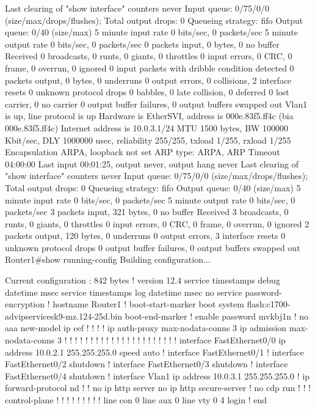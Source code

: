   Last clearing of "show interface" counters never
  Input queue: 0/75/0/0 (size/max/drops/flushes); Total output drops: 0
  Queueing strategy: fifo
  Output queue: 0/40 (size/max)
  5 minute input rate 0 bits/sec, 0 packets/sec
  5 minute output rate 0 bits/sec, 0 packets/sec
     0 packets input, 0 bytes, 0 no buffer
     Received 0 broadcasts, 0 runts, 0 giants, 0 throttles
     0 input errors, 0 CRC, 0 frame, 0 overrun, 0 ignored
     0 input packets with dribble condition detected
     0 packets output, 0 bytes, 0 underruns
     0 output errors, 0 collisions, 2 interface resets
     0 unknown protocol drops
     0 babbles, 0 late collision, 0 deferred
     0 lost carrier, 0 no carrier
     0 output buffer failures, 0 output buffers swapped out
Vlan1 is up, line protocol is up 
  Hardware is EtherSVI, address is 000e.83f5.ff4c (bia 000e.83f5.ff4c)
  Internet address is 10.0.3.1/24
  MTU 1500 bytes, BW 100000 Kbit/sec, DLY 1000000 usec, 
     reliability 255/255, txload 1/255, rxload 1/255
  Encapsulation ARPA, loopback not set
  ARP type: ARPA, ARP Timeout 04:00:00
  Last input 00:01:25, output never, output hang never
  Last clearing of "show interface" counters never
  Input queue: 0/75/0/0 (size/max/drops/flushes); Total output drops: 0
  Queueing strategy: fifo
  Output queue: 0/40 (size/max)
  5 minute input rate 0 bits/sec, 0 packets/sec
  5 minute output rate 0 bits/sec, 0 packets/sec
     3 packets input, 321 bytes, 0 no buffer
     Received 3 broadcasts, 0 runts, 0 giants, 0 throttles
     0 input errors, 0 CRC, 0 frame, 0 overrun, 0 ignored
     2 packets output, 120 bytes, 0 underruns
     0 output errors, 3 interface resets
     0 unknown protocol drops
     0 output buffer failures, 0 output buffers swapped out
Router1#show running-config
Building configuration...

Current configuration : 842 bytes
!
version 12.4
service timestamps debug datetime msec
service timestamps log datetime msec
no service password-encryption
!
hostname Router1
!
boot-start-marker
boot system flash:c1700-advipservicesk9-mz.124-25d.bin
boot-end-marker
!
enable password mvkbj1n
!
no aaa new-model
ip cef
!
!
!
!
ip auth-proxy max-nodata-conns 3
ip admission max-nodata-conns 3
!
!
!
!
!
!
!
!
!
!
!
!
!
!
!
!
!
! 
!
!
!
!
interface FastEthernet0/0
 ip address 10.0.2.1 255.255.255.0
 speed auto
!
interface FastEthernet0/1
!
interface FastEthernet0/2
 shutdown
!
interface FastEthernet0/3
 shutdown
!
interface FastEthernet0/4
 shutdown
!
interface Vlan1
 ip address 10.0.3.1 255.255.255.0
!
ip forward-protocol nd
!
!
no ip http server
no ip http secure-server
!         
no cdp run
!
!
!
control-plane
!
!
!
!
!
!
!
!
!
line con 0
line aux 0
line vty 0 4
 login
!
end

